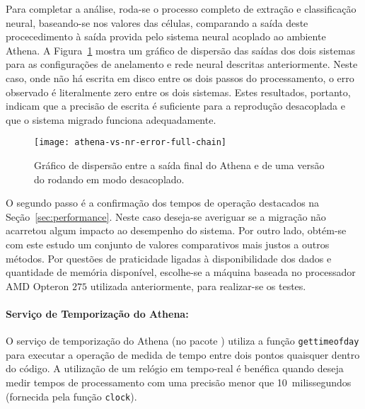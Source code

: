 Para completar a análise, roda-se o processo completo de extração e
classificação neural, baseando-se nos valores das células, comparando a saída
deste procecedimento à saída provida pelo sistema neural acoplado ao ambiente
Athena. A Figura~\ref{fig:athena-vs-nr-full} mostra um gráfico de dispersão
das saídas dos dois sistemas para as configurações de anelamento e rede neural
descritas anteriormente. Neste caso, onde não há escrita em disco entre os
dois passos do processamento, o erro observado é literalmente zero entre os
dois sistemas. Estes resultados, portanto, indicam que a precisão de escrita é
suficiente para a reprodução desacoplada e que o sistema migrado funciona
adequadamente.

\begin{figure}
\begin{center}
\texttt{[image: athena-vs-nr-error-full-chain]}
\end{center}
\caption{Gráfico de dispersão entre a saída final do Athena e de uma versão do
 rodando em modo desacoplado.}
\label{fig:athena-vs-nr-full}
\end{figure}

O segundo passo é a confirmação dos tempos de operação destacados na
Seção~\ref{sec:performance}. Neste caso deseja-se averiguar se a migração não
acarretou algum impacto ao desempenho do sistema. Por outro lado, obtém-se com
este estudo um conjunto de valores comparativos mais justos a outros
métodos. Por questões de praticidade ligadas à disponibilidade dos dados e
quantidade de memória disponível, escolhe-se a máquina baseada no processador
AMD Opteron $275$ utilizada anteriormente, para realizar-se os testes.

\paragraph{Serviço de Temporização do Athena:} O serviço de temporização do
Athena (no pacote ) utiliza a função \texttt{gettimeofday}
\cite{web:gcc-libc} para executar a operação de medida de tempo entre dois
pontos quaisquer dentro do código. A utilização de um relógio em tempo-real é
benéfica quando deseja medir tempos de processamento com uma precisão menor
que 10~milissegundos (fornecida pela função \texttt{clock}). 

